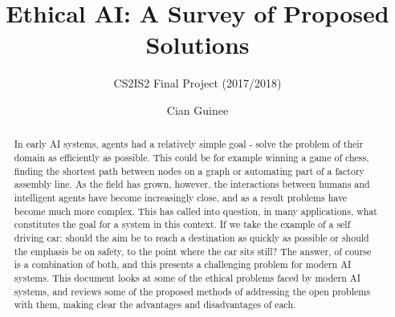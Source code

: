 \documentclass{svproc}
\begin{document}
\mainmatter
\title{Ethical AI: A Survey of Proposed Solutions}
\subtitle{CS2IS2 Final Project (2017/2018)}
\author{Cian Guinee}


\maketitle              %

\begin{abstract}
In early AI systems, agents had a relatively simple goal - solve the problem of their domain as efficiently as possible. This could be for example winning a game of chess, finding the shortest path between nodes on a graph or automating part of a factory assembly line. As the field has grown, however, the interactions between humans and intelligent agents have become increasingly close, and as a result problems have become much more complex. This has called into question, in many applications, what constitutes the goal for a system in this context. If we take the example of a self driving car: should the aim be to reach a destination as quickly as possible or should the emphasis be on safety, to the point where the car sits still? The answer, of course is a combination of both, and this presents a challenging problem for modern AI systems. This document looks at some of the ethical problems faced by modern AI systems, and reviews some of the proposed methods of addressing the open problems with them, making clear the advantages and disadvantages of each.
\end{abstract}
%
\end{document}
